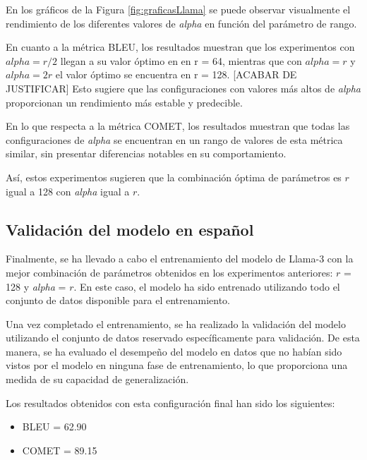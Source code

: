 \documentclass[11pt,spanish,listoffigures,listoftables]{tfgetsinf}
\begin{document}
En los gráficos de la Figura \ref{fig:graficasLlama} se puede observar visualmente el rendimiento de los diferentes valores de \textit{alpha} en función del parámetro de rango.

En cuanto a la métrica BLEU, los resultados muestran que los experimentos con $alpha = r/2$ llegan a su valor óptimo en en r = 64, mientras que con $alpha = r$ y $alpha = 2r$ el valor óptimo se encuentra en r = 128. [ACABAR DE JUSTIFICAR] Esto sugiere que las configuraciones con valores más altos de \textit{alpha} proporcionan un rendimiento más estable y predecible.


En lo que respecta a la métrica COMET, los resultados muestran que todas las configuraciones de \textit{alpha} se encuentran en un rango de valores de esta métrica similar, sin presentar diferencias notables en su comportamiento.

Así, estos experimentos sugieren que la combinación óptima de parámetros es $r$ igual a 128 con \textit{alpha} igual a $r$.

\subsection{Validación del modelo en español}

Finalmente, se ha llevado a cabo el entrenamiento del modelo de Llama-3 con la mejor combinación de parámetros obtenidos en los experimentos anteriores: $r$ = 128 y \textit{alpha} = $r$. En este caso, el modelo ha sido entrenado utilizando todo el conjunto de datos disponible para el entrenamiento.

Una vez completado el entrenamiento, se ha realizado la validación del modelo utilizando el conjunto de datos reservado específicamente para validación. De esta manera, se ha evaluado el desempeño del modelo en datos que no habían sido vistos por el modelo en ninguna fase de entrenamiento, lo que proporciona una medida de su capacidad de generalización.

Los resultados obtenidos con esta configuración final han sido los siguientes:

\begin{itemize}
	\item BLEU = 62.90
	\item COMET = 89.15
\end{itemize}
\end{document}
